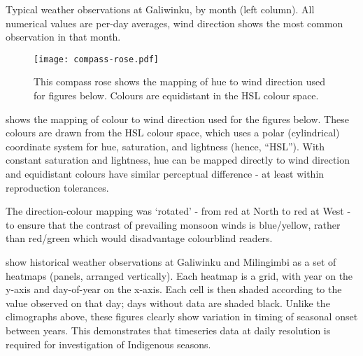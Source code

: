 
\begin{landscape}
\begin{table}
    
    \caption[Monthly weather observations at Galiwinku]{
        Typical weather observations at Galiwinku, by month (left column).
        All numerical values are per-day averages, wind direction shows the
        most common observation in that month.}
    \label{tab:galiwinku-monthly-summary}
\end{table}
\end{landscape}


\begin{wrapfigure}{R}{0.5\textwidth}
    \texttt{[image: compass-rose.pdf]}
    \caption[Compass Rose mapping colour to wind direction]{
        This compass rose shows the mapping of hue to wind direction used
        for figures below.  Colours are equidistant in the HSL colour space.}
    \label{fig:compass-rose}
\end{wrapfigure}

 shows the mapping of colour to wind direction used
for the figures below.  These colours are drawn from the HSL colour space,
which uses a polar (cylindrical) coordinate system for hue, saturation,
and lightness (hence, ``HSL'').  With constant saturation and lightness,
hue can be mapped directly to wind direction and equidistant colours
have similar perceptual difference - at least within reproduction tolerances.

The direction-colour mapping was `rotated' - from red at North to red at West -
to ensure that the contrast of prevailing monsoon winds is blue/yellow,
rather than red/green which would disadvantage colourblind readers.


show historical weather observations at Galiwinku and Milingimbi as a set of
heatmaps (panels, arranged vertically).  Each heatmap is a grid, with year
on the y-axis and day-of-year on the x-axis.  Each cell is then shaded
according to the value observed on that day; days without data are shaded
black.
%
Unlike the climographs above, these figures clearly show variation in timing
of seasonal onset between years.  This demonstrates that timeseries data
at daily resolution is required for investigation of Indigenous seasons.

